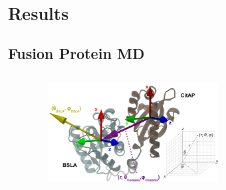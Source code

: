 \documentclass[english]{beamer}
\begin{document}
\begin{frame}
    \frametitle{Results}
\framesubtitle{Fusion Protein MD}%

    \vspace{0.94\topmargin}

    \begin{figure}
        \hspace{0.0\textwidth}
        \includegraphics[width=0.40\textwidth]{figures/Collective_coords/collective_coords.pdf}
    \end{figure}     

    \vspace{-0.5cm}
 


\end{frame}
\end{document}
